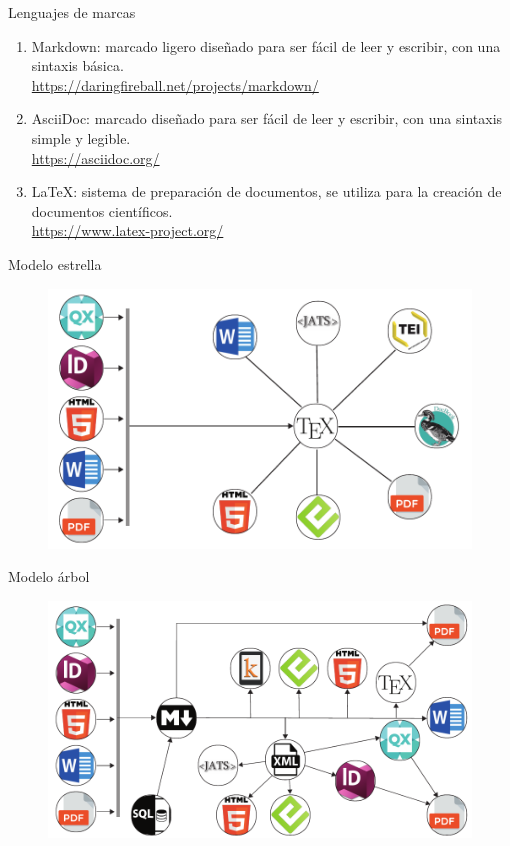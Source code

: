 \documentclass[14pt,aspectratio=169]{beamer}
\begin{document}
\begin{frame}{Lenguajes de marcas}
	\begin{enumerate}
		\item Markdown: marcado ligero diseñado para ser fácil de leer y escribir, con una sintaxis básica.\\
		\url{https://daringfireball.net/projects/markdown/}
		\item AsciiDoc: marcado diseñado para ser fácil de leer y escribir, con una sintaxis simple y legible.\\
		\url{https://asciidoc.org/}
		\item LaTeX: sistema de preparación de documentos, se utiliza para la creación de documentos científicos.\\
		\url{https://www.latex-project.org/}
	\end{enumerate}
\end{frame}

\begin{frame}{Modelo estrella}
	\begin{figure}
		\centering
		\includegraphics[width=.7\textwidth]{estrella.pdf}
	\end{figure}
\end{frame}

\begin{frame}{Modelo árbol}
	\begin{figure}
		\centering
		\includegraphics[width=.8\textwidth]{completo.pdf}
	\end{figure}
\end{frame}
\end{document}
